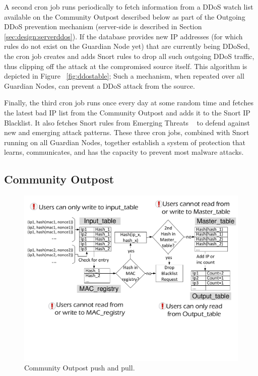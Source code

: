 A second cron job runs periodically to fetch information from a DDoS watch list available on the Community Outpost described below as part of the Outgoing DDoS prevention mechanism (server-side is described in Section \ref{sec:design:serverddos}). If the database provides new IP addresses (for which rules do not exist on the Guardian Node yet) that are currently being DDoSed, the cron job creates and adds Snort rules to drop all such outgoing DDoS traffic, thus clipping off the attack at the compromised source itself. 
This algorithm is depicted in Figure ~\ref{fig:ddostable}; Such a mechanism, when repeated over all Guardian Nodes, can prevent a DDoS attack from the source.

Finally, the third cron job runs once every day at some random time and fetches the latest bad IP list from the Community Outpost and adds it to the Snort IP Blacklist. It also fetches Snort rules from Emerging Threats ~\cite{emerging} to defend against new and emerging attack patterns. These three cron jobs, combined with Snort running on all Guardian Nodes, together establish a system of protection that learns, communicates, and has the capacity to prevent most malware attacks.

\subsection{Community Outpost}
\label{sec:design:server}

\begin{figure}
    \centering
    \includegraphics[width=0.95\linewidth]{figs/blacklistserver.pdf}
    \caption{Community Outpost push and pull.}
    \label{fig:blacklistserver}
\end{figure}

